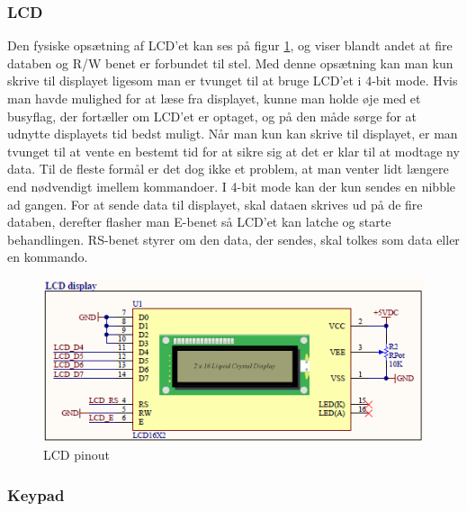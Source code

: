 \subsubsection{LCD}

Den fysiske opsætning af LCD'et kan ses på figur \ref{fig:LCD}, og viser blandt andet at fire databen og R/W benet er forbundet til stel. Med denne opsætning kan man kun skrive til displayet ligesom man er tvunget til at bruge LCD'et i 4-bit mode. Hvis man havde mulighed for at læse fra displayet, kunne man holde øje med et busyflag, der fortæller om LCD'et er optaget, og på den måde sørge for at udnytte displayets tid bedst muligt. Når man kun kan skrive til displayet, er man tvunget til at vente en bestemt tid for at sikre sig at det er klar til at modtage ny data. Til de fleste formål er det dog ikke et problem, at man venter lidt længere end nødvendigt imellem kommandoer. I 4-bit mode kan der kun sendes en nibble ad gangen. For at sende data til displayet, skal dataen skrives ud på de fire databen, derefter flasher man E-benet så LCD'et kan latche og starte behandlingen. RS-benet styrer om den data, der sendes, skal tolkes som data eller en kommando.

\begin{figure}[h]
			\begin{center}
			\includegraphics[scale=0.9]{Billeder/LCD.PNG}
			\end{center}
			\label{fig:LCD}
			\caption{LCD pinout}
\end{figure}



\subsubsection{Keypad}

